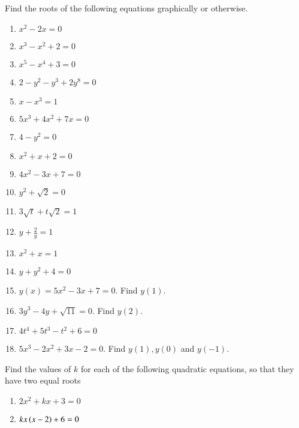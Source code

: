 Find the roots of the following equations graphically or otherwise.
\begin{enumerate}[label=\thesubsection.\arabic*, ref=\thesubsection.\theenumi]
	\item $x^2-2x=0$
	\item $x^3-x^2+2=0$
	\item $x^5-x^4+3=0$
	\item $2-y^2-y^3+2y^8=0$
	\item $x-x^3=1$
	\item $5x^3+4x^2+7x=0$
	\item $4-y^2=0$
	\item $x^2+x+2 = 0$
	\item $4x^2-3x+7 = 0$
	\item $y^2+\sqrt{2} = 0$
	\item $3\sqrt{t}+t\sqrt{2} = 1$
	\item $y+\frac{2}{y} = 1$
	\item $x^2+x = 1$
	\item $y+{y}^2+4 = 0$
	\item $y(x)=5x^2-3x+7 = 0$.  Find $y(1).$
	\item $3y^3-4y+\sqrt{11}=0$.  Find $y(2).$
	\item $4t^4+5t^3-t^2+6=0$
	\item $5x^3-2x^2+3x-2=0$.  Find $y(1), y(0)$ and $y(-1)$.
\end{enumerate}
Find the values of $k$ for each of the following quadratic equations, so that they have two equal roots
\begin{enumerate}[label=\thesubsection.\arabic*, ref=\thesubsection.\theenumi,resume*]
\item 	$2x^2+kx+3 = 0$
\item 	$kx\left(x-2\right)+6= 0$
\end{enumerate}
